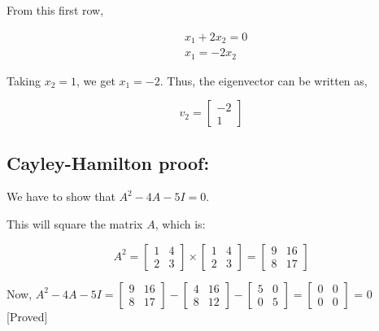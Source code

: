 \documentclass{article}
\begin{document}
    \vspace{10pt}
    From this first row,
    
    \[
    \begin{aligned}
        & x_1 + 2x_2 = 0 \\
        & x_1 = -2x_2
    \end{aligned}
    \]
    
    Taking \(x_2 = 1\), we get \(x_1 = -2\). Thus, the eigenvector can be written as,
    
    \[
    v_2 = \begin{bmatrix}
        -2 \\
        1
    \end{bmatrix}
    \]
    
    \subsection*{Cayley-Hamilton proof:}
    We have to show that \( A^2 - 4A - 5I = 0 \).


    This will square the matrix \( A \), which is:

    \[ A^2 = \begin{bmatrix}
        1 & 4 \\
        2 & 3
    \end{bmatrix} \times \begin{bmatrix}
        1 & 4 \\
        2 & 3
    \end{bmatrix} = \begin{bmatrix}
        9 & 16 \\
        8 & 17
    \end{bmatrix} \]

    Now, \( A^2 - 4A - 5I = \begin{bmatrix}
        9 & 16 \\
        8 & 17
    \end{bmatrix} - \begin{bmatrix}
        4 & 16 \\
        8 & 12
    \end{bmatrix} - \begin{bmatrix}
        5 & 0 \\
        0 & 5
    \end{bmatrix}
    = \begin{bmatrix}
        0 & 0 \\
        0 & 0
    \end{bmatrix} \)
    = 0
    [Proved]
\end{document}
